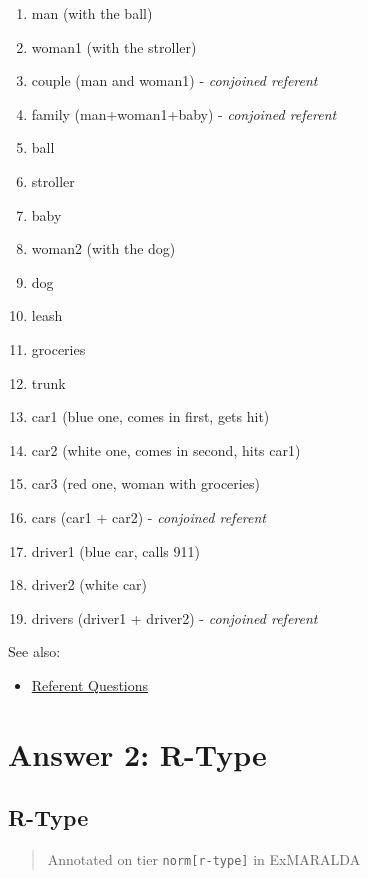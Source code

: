 \documentclass[
]{book}
\providecommand{\tightlist}{%
  \setlength{\itemsep}{0pt}\setlength{\parskip}{0pt}}
\begin{document}
\begin{enumerate}
\def\labelenumi{\arabic{enumi}.}
\tightlist
\item
  man (with the ball)
\item
  woman1 (with the stroller)
\item
  couple (man and woman1) - \emph{conjoined referent}
\item
  family (man+woman1+baby) - \emph{conjoined referent}
\item
  ball
\item
  stroller
\item
  baby
\item
  woman2 (with the dog)
\item
  dog
\item
  leash
\item
  groceries
\item
  trunk
\item
  car1 (blue one, comes in first, gets hit)
\item
  car2 (white one, comes in second, hits car1)
\item
  car3 (red one, woman with groceries)
\item
  cars (car1 + car2) - \emph{conjoined referent}
\item
  driver1 (blue car, calls 911)
\item
  driver2 (white car)
\item
  drivers (driver1 + driver2) - \emph{conjoined referent}
\end{enumerate}

See also:

\begin{itemize}
\tightlist
\item
  \protect\hyperlink{referents-1}{Referent Questions}
\end{itemize}

\hypertarget{answer-2-r-type}{%
\chapter{Answer 2: R-Type}\label{answer-2-r-type}}

\hypertarget{r-type}{%
\section{R-Type}\label{r-type}}

\begin{quote}
Annotated on tier \texttt{norm{[}r-type{]}} in ExMARALDA
\end{quote}
\end{document}
